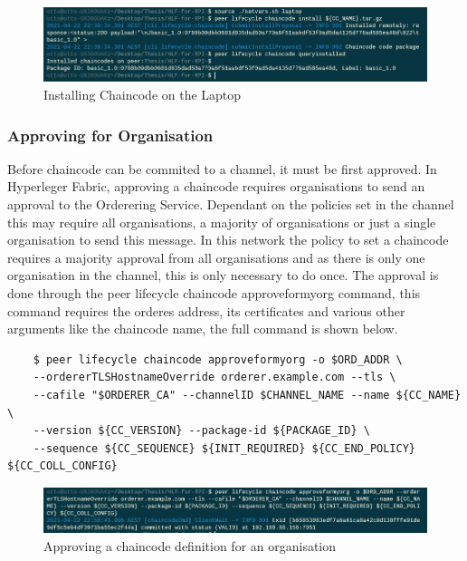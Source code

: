 \begin{figure}[h]
    \centering
    \includegraphics{install chaincode.PNG}
    \caption{Installing Chaincode on the Laptop}
    \label{fig:my_label}
\end{figure}


\subsubsection{Approving for Organisation}

Before chaincode can be commited to a channel, it must be first approved. In Hyperleger Fabric, approving a chaincode requires organisations to send an approval to the Orderering Service. Dependant on the policies set in the channel this may require all organisations, a majority of organisations or just a single organisation to send this message. In this network the policy to set a chaincode requires a majority approval from all organisations and as there is only one organisation in the channel, this is only necessary to do once. The approval is done through the peer lifecycle chaincode approveformyorg command, this command requires the orderes address, its certificates and various other arguments like the chaincode name, the full command is shown below.


\begin{verbatim}
    $ peer lifecycle chaincode approveformyorg -o $ORD_ADDR \
    --ordererTLSHostnameOverride orderer.example.com --tls \
    --cafile "$ORDERER_CA" --channelID $CHANNEL_NAME --name ${CC_NAME} \
    --version ${CC_VERSION} --package-id ${PACKAGE_ID} \
    --sequence ${CC_SEQUENCE} ${INIT_REQUIRED} ${CC_END_POLICY} ${CC_COLL_CONFIG}
\end{verbatim}
\begin{figure}[h]
    \centering
    \includegraphics{images/approveformyorg.PNG}
    \caption{Approving a chaincode definition for an organisation}
    \label{fig:my_label}
\end{figure}

